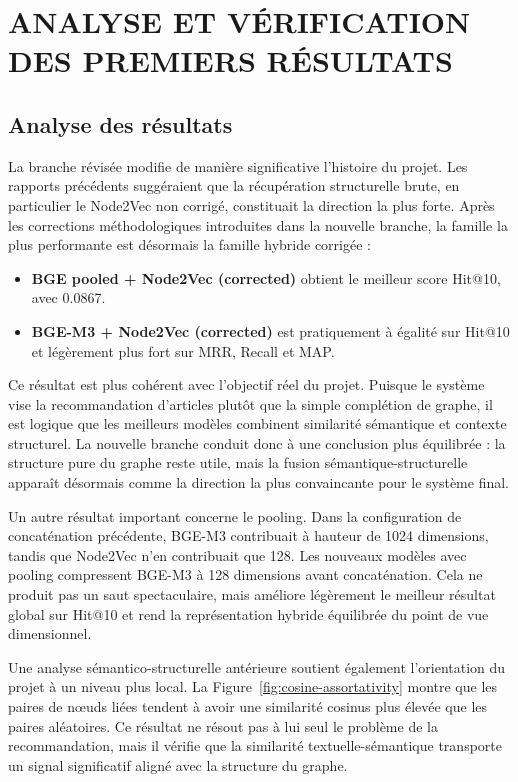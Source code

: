 \chapter{ANALYSE ET VÉRIFICATION DES PREMIERS RÉSULTATS}
\thispagestyle{empty}

\section{Analyse des résultats}

La branche révisée modifie de manière significative l'histoire du projet. Les
rapports précédents suggéraient que la récupération structurelle brute, en
particulier le Node2Vec non corrigé, constituait la direction la plus forte.
Après les corrections méthodologiques introduites dans la nouvelle branche, la
famille la plus performante est désormais la famille hybride corrigée :
\begin{itemize}
    \item \textbf{BGE pooled + Node2Vec (corrected)} obtient le meilleur score
    Hit@10, avec 0.0867.
    \item \textbf{BGE-M3 + Node2Vec (corrected)} est pratiquement à égalité sur
    Hit@10 et légèrement plus fort sur MRR, Recall et MAP.
\end{itemize}

Ce résultat est plus cohérent avec l'objectif réel du projet. Puisque le
système vise la recommandation d'articles plutôt que la simple complétion de
graphe, il est logique que les meilleurs modèles combinent similarité
sémantique et contexte structurel. La nouvelle branche conduit donc à une
conclusion plus équilibrée : la structure pure du graphe reste utile, mais la
fusion sémantique-structurelle apparaît désormais comme la direction la plus
convaincante pour le système final.

Un autre résultat important concerne le pooling. Dans la configuration de
concaténation précédente, BGE-M3 contribuait à hauteur de 1024 dimensions,
tandis que Node2Vec n'en contribuait que 128. Les nouveaux modèles avec
pooling compressent BGE-M3 à 128 dimensions avant concaténation. Cela ne
produit pas un saut spectaculaire, mais améliore légèrement le meilleur
résultat global sur Hit@10 et rend la représentation hybride équilibrée du
point de vue dimensionnel.

Une analyse sémantico-structurelle antérieure soutient également l'orientation
du projet à un niveau plus local. La Figure~\ref{fig:cosine-assortativity}
montre que les paires de nœuds liées tendent à avoir une similarité cosinus
plus élevée que les paires aléatoires. Ce résultat ne résout pas à lui seul le
problème de la recommandation, mais il vérifie que la similarité
textuelle-sémantique transporte un signal significatif aligné avec la
structure du graphe.

